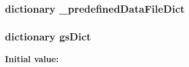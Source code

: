 \subsubsection[{\+\_\+predefined\+Data\+File\+Dict}]{\setlength{\rightskip}{0pt plus 5cm}dictionary \+\_\+predefined\+Data\+File\+Dict}\label{namespacepyneb_1_1utils_1_1physics_a78612b3baa31d8b1afffc83fa7e63117}
\hypertarget{namespacepyneb_1_1utils_1_1physics_ab143ee5cc76a192f8c1811837c142d19}{}
\subsubsection[{gs\+Dict}]{\setlength{\rightskip}{0pt plus 5cm}dictionary gs\+Dict}\label{namespacepyneb_1_1utils_1_1physics_ab143ee5cc76a192f8c1811837c142d19}
{\bfseries Initial value\+:}
